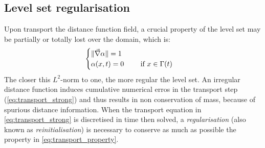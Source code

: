 \subsection{Level set regularisation}
%
Upon transport the distance function field, a crucial property of the level set may be partially or totally 
lost over the domain, which is:
\begin{align}
\label{eq:transport_property}
\begin{cases}
\lVert \vec{\nabla} \alpha \rVert = 1 \\ 
\alpha (x,t) = 0 	\qquad  \text{ if } x \in \Gamma(t)
\end{cases}
\end{align}
The closer this $L^2$-norm to one, the more regular the level set. An irregular distance function induces 
cumulative numerical erros in the transport step (\cref{eq:transport_strong}) and thus results in non 
conservation of mass, because of spurious distance information. 
When the transport equation in \cref{eq:transport_strong} is discretised in time then solved, a \emph{regularisation} 
(also known as \emph{reinitialisation}) is necessary to conserve as much as 
possible the property in \cref{eq:transport_property}.

